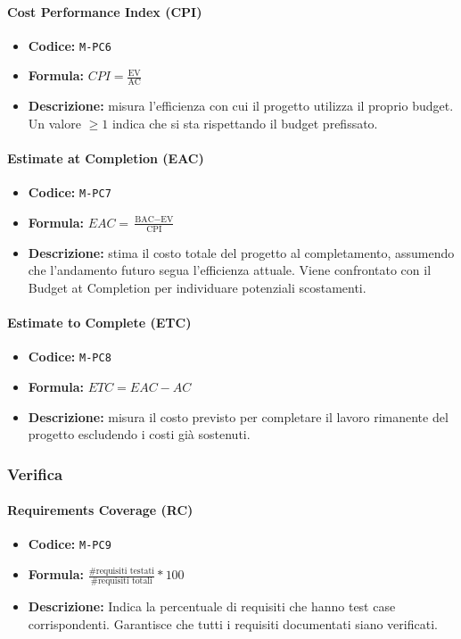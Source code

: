 \documentclass[a4paper,12pt]{article}
\begin{document}
\paragraph{Cost Performance Index (CPI)}
\begin{itemize}
    \item \textbf{Codice:} \texttt{M-PC6}
    \item \textbf{Formula:} $CPI=\frac{\text{EV}}{\text{AC}}$
    \item \textbf{Descrizione:} misura l'efficienza con cui il progetto utilizza il proprio budget. Un valore $\geq 1$ indica che si sta rispettando il budget prefissato.
\end{itemize}

\paragraph{Estimate at Completion (EAC)}
\begin{itemize}
    \item \textbf{Codice:} \texttt{M-PC7}
    \item \textbf{Formula:} $EAC=\frac{\text{BAC}-\text{EV}}{\text{CPI}}$
    \item \textbf{Descrizione:} stima il costo totale del progetto al completamento, assumendo che l’andamento futuro segua l’efficienza attuale. Viene confrontato con il Budget at Completion per individuare potenziali scostamenti.
\end{itemize}

\paragraph{Estimate to Complete (ETC)}
\begin{itemize}
    \item \textbf{Codice:} \texttt{M-PC8}
    \item \textbf{Formula:} $ETC=EAC-AC$
    \item \textbf{Descrizione:} misura il costo previsto per completare il lavoro rimanente del progetto escludendo i costi già sostenuti.
\end{itemize}

\subsubsection{Verifica}

\paragraph{Requirements Coverage (RC)}
\begin{itemize}
    \item \textbf{Codice:} \texttt{M-PC9}
    \item \textbf{Formula:} $\frac{\text{\# requisiti testati}}{\text{\# requisiti totali}}*100$
    \item \textbf{Descrizione:} Indica la percentuale di requisiti che hanno test case corrispondenti. Garantisce che tutti i requisiti documentati siano verificati.
\end{itemize}
\end{document}
